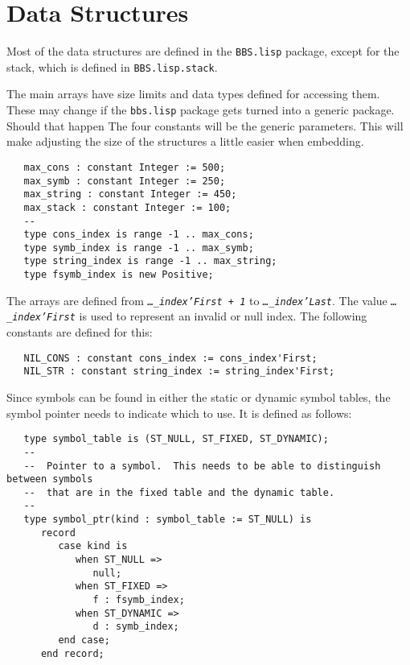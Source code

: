 \documentclass[10pt, openany]{book}
\newcommand{\package}[1]{\texttt{#1}}
\newcommand{\constant}[1]{\emph{\texttt{#1}}}
\newcommand{\keyword}[1]{\texttt{#1}}
\begin{document}
\section{Data Structures}
Most of the data structures are defined in the \package{BBS.lisp} package, except for the stack, which is defined in \package{BBS.lisp.stack}.

The main arrays have size limits and data types defined for accessing them.  These may change if the \keyword{bbs.lisp} package gets turned into a generic package.  Should that happen The four constants will be the generic parameters.  This will make adjusting the size of the structures a little easier when embedding.
\lstset{language=Ada}
\begin{lstlisting}
   max_cons : constant Integer := 500;
   max_symb : constant Integer := 250;
   max_string : constant Integer := 450;
   max_stack : constant Integer := 100;
   --
   type cons_index is range -1 .. max_cons;
   type symb_index is range -1 .. max_symb;
   type string_index is range -1 .. max_string;
   type fsymb_index is new Positive;
\end{lstlisting}

The arrays are defined from \constant{\ldots{}\_index'First + 1} to \constant{\ldots\_index'Last}.  The value \constant{\ldots\_index'First} is used to represent an invalid or null index.  The following constants are defined for this:
\begin{lstlisting}
   NIL_CONS : constant cons_index := cons_index'First;
   NIL_STR : constant string_index := string_index'First;
\end{lstlisting}

Since symbols can be found in either the static or dynamic symbol tables, the symbol pointer needs to indicate which to use.  It is defined as follows:
\begin{lstlisting}
   type symbol_table is (ST_NULL, ST_FIXED, ST_DYNAMIC);
   --
   --  Pointer to a symbol.  This needs to be able to distinguish between symbols
   --  that are in the fixed table and the dynamic table.
   --
   type symbol_ptr(kind : symbol_table := ST_NULL) is
      record
         case kind is
            when ST_NULL =>
               null;
            when ST_FIXED =>
               f : fsymb_index;
            when ST_DYNAMIC =>
               d : symb_index;
         end case;
      end record;
\end{lstlisting}
\end{document}
